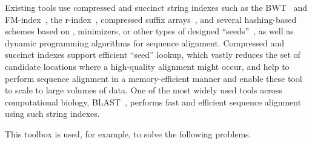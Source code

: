 \begin{itemize}[leftmargin=*,noitemsep,nolistsep]
Existing tools use compressed and succinct string indexes such as the BWT~\cite{burrows1994block} and FM-index~\cite{ferragina2000opportunistic}, the r-index~\cite{gagie2018optimal}, compressed suffix arrays~\cite{grossi2000compressed}, and several hashing-based schemes based on \kmers, minimizers, or other types of designed ``seeds''~\cite{li2018minimap2,pibiri2022sparse,sahlin2022strobealign}, as well as dynamic programming algorithms for sequence alignment.
Compressed and succinct indexes support efficient ``seed'' lookup, which vastly reduces the set of candidate locations where a high-quality alignment might occur, and help to perform sequence alignment in a memory-efficient manner and enable these tool to scale to large volumes of data.
One of the most widely used tools across computational biology, BLAST~\cite{altschul1990basic}, performs fast and efficient sequence alignment using such string indexes.
\end{itemize}

\noindent
This toolbox is used, for example, to solve the following problems.

